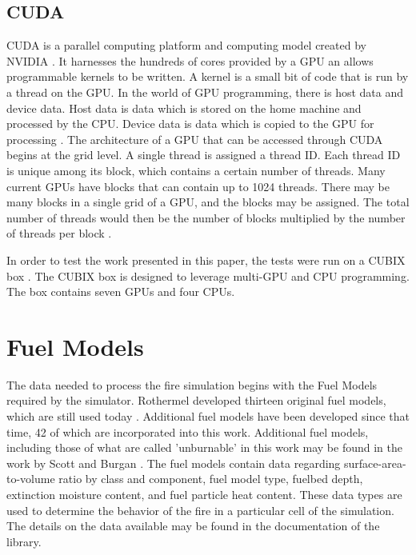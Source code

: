 \subsection{CUDA}
CUDA is a parallel computing platform and computing model created by NVIDIA \cite{cuda}. It harnesses the hundreds of cores provided by a GPU an allows programmable kernels to be written. A kernel is a small bit of code that is run by a thread on the GPU. In the world of GPU programming, there is host data and device data. Host data is data which is stored on the home machine and processed by the CPU. Device data is data which is copied to the GPU for processing \cite{cudabyexample}. The architecture of a GPU that can be accessed through CUDA begins at the grid level. A single thread is assigned a thread ID. Each thread ID is unique among its block, which contains a certain number of threads. Many current GPUs have blocks that can contain up to 1024 threads. There may be many blocks in a single grid of a GPU, and the blocks may be assigned. The total number of threads would then be the number of blocks multiplied by the number of threads per block \cite{cuda}. 

In order to test the work presented in this paper, the tests were run on a CUBIX box \cite{cubix}. The CUBIX box is designed to leverage multi-GPU and CPU programming. The box contains seven GPUs and four CPUs. 

\section{Fuel Models}
The data needed to process the fire simulation begins with the Fuel Models required by the simulator. Rothermel developed thirteen original fuel models, which are still used today \cite{1983roth}. Additional fuel models have been developed since that time, 42 of which are incorporated into this work. Additional fuel models, including those of what are called 'unburnable' in this work may be found in the work by Scott and Burgan \cite{fuelmodels}.  The fuel models contain data regarding surface-area-to-volume ratio by class and component, fuel model type, fuelbed depth, extinction moisture content, and fuel particle heat content. These data types are used to determine the behavior of the fire in a particular cell of the simulation. The details on the data available may be found in the documentation of the library. 